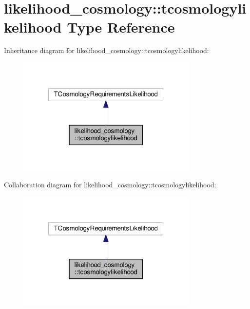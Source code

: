 \hypertarget{structlikelihood__cosmology_1_1tcosmologylikelihood}{}\section{likelihood\+\_\+cosmology\+:\+:tcosmologylikelihood Type Reference}
\label{structlikelihood__cosmology_1_1tcosmologylikelihood}


Inheritance diagram for likelihood\+\_\+cosmology\+:\+:tcosmologylikelihood\+:
\nopagebreak
\begin{figure}[H]
\begin{center}
\leavevmode
\includegraphics[width=254pt]{structlikelihood__cosmology_1_1tcosmologylikelihood__inherit__graph}
\end{center}
\end{figure}


Collaboration diagram for likelihood\+\_\+cosmology\+:\+:tcosmologylikelihood\+:
\nopagebreak
\begin{figure}[H]
\begin{center}
\leavevmode
\includegraphics[width=254pt]{structlikelihood__cosmology_1_1tcosmologylikelihood__coll__graph}
\end{center}
\end{figure}

